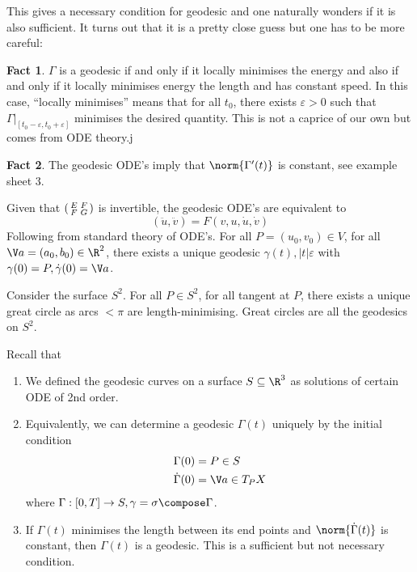 \documentclass[a4paper]{article}
\theoremstyle{definition}
\newtheorem*{fact}{Fact}
\begin{document}
This gives a necessary condition for geodesic and one naturally wonders if it is also sufficient. It turns out that it is a pretty close guess but one has to be more careful:

\begin{fact}
  \(\Gamma\) is a geodesic if and only if it locally minimises the energy and also if and only if it locally minimises energy the length and has constant speed. In this case, ``locally minimises'' means that for all \(t_0\), there exists \(\varepsilon > 0\) such that \(\Gamma|_{[t_0 - \varepsilon, t_0 + \varepsilon]}\) minimises the desired quantity. This is not a caprice of our own but comes from ODE theory.j
\end{fact}

\begin{fact}
  The geodesic ODE's imply that \(\norm{\Gamma'(t)}\) is constant, see example sheet 3.
\end{fact}

\begin{remark}
  Given that \(\begin{psmallmatrix} E & F \\ F & G \end{psmallmatrix}\) is invertible, the geodesic ODE's are equivalent to
  \[
    (\ddot u, \ddot v) = F(v, u, \dot u, \dot v)
  \]
  Following from standard theory of ODE's. For all \(P = (u_0, v_0) \in V\), for all \(\V a = (a_0, b_0) \in \R^2\), there exists a unique geodesic \(\gamma(t), |t| \varepsilon\) with \(\gamma(0) = P, \dot \gamma(0) = \V a\).
\end{remark}

\begin{eg}
  Consider the surface \(S^2\). For all \(P \in S^2\), for all tangent at \(P\), there exists a unique great circle as arcs \(< \pi\) are length-minimising. Great circles are all the geodesics on \(S^2\).
\end{eg}

Recall that
\begin{enumerate}
\item We defined the geodesic curves on a surface \(S \subseteq \R^3\) as solutions of certain ODE of 2nd order.
\item Equivalently, we can determine a geodesic \(\Gamma(t)\) uniquely by the initial condition
\begin{align*}
  \Gamma(0) &= P \in S \\
  \dot \Gamma(0) &= \V a \in T_PX
\end{align*}
where \(\Gamma: [0, T] \to S, \gamma = \sigma \compose \Gamma\).
\item If \(\Gamma(t)\) minimises the length between its end points and \(\norm{\dot \Gamma(t)}\) is constant, then \(\Gamma(t)\) is a geodesic. This is a sufficient but not necessary condition.
\end{enumerate}
\end{document}
